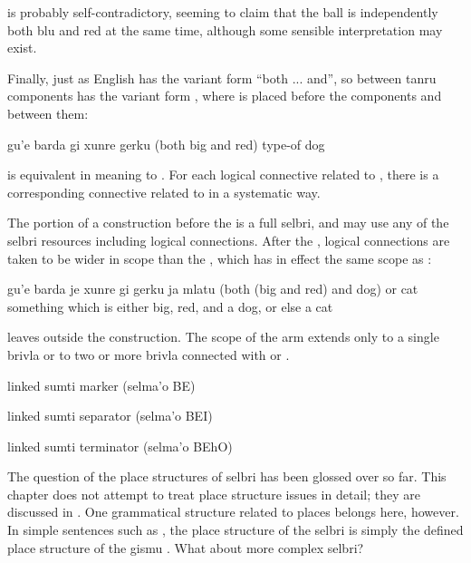 {\noindent}is probably self-contradictory, seeming to claim that the ball
    is independently both blu and red at the same time, although
    some sensible interpretation may exist. 

Finally, just as English  has the variant form ``both
    ... and'', so  between tanru components has the variant
    form , where  is placed before the
    components and  between them:
\begin{example}
gu'e barda gi xunre gerku\n
(both big and red) type-of dog
\end{example}

{\noindent}is equivalent in meaning to .
    For each logical connective related to , there is a
    corresponding connective related to  in a
    systematic way. 

The portion of a  construction before the
     is a full selbri, and may use any of the selbri
    resources including  logical connections. After the
    , logical connections are taken to be wider in scope than
    the , which has in effect the same scope as
    :
\begin{example}
gu'e barda je xunre gi gerku ja mlatu\n
(both (big and red) and dog) or cat\n
something which is either big, red, and a dog,\n
\T	or else a cat
\end{example}

{\noindent}leaves  outside the  construction. The
    scope of the  arm extends only to a single brivla or to
    two or more brivla connected with  or .



\begin{description}
\item[be] linked sumti marker (selma'o BE)
\item[bei] linked sumti separator (selma'o BEI)
\item[be'o] linked sumti terminator (selma'o BEhO)
\end{description}

The question of the place structures of selbri has been
    glossed over so far. This chapter does not attempt to treat
    place structure issues in detail; they are discussed in . One grammatical structure
    related to places belongs here, however. In simple sentences
    such as , the place structure of
    the selbri is simply the defined place structure of the gismu
    . What about more complex selbri?

